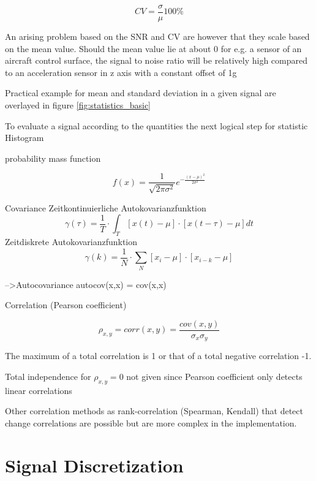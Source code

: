 \begin{equation}
    \label{eq:coeff_var}
    CV = \frac{\sigma}{\mu}100\%
\end{equation}

An arising problem based on the SNR and CV are however that they scale based on the mean value. Should the mean value lie at about 0 for e.g. a sensor of an aircraft control surface, the signal to noise ratio will be relatively high compared to an acceleration sensor in z axis with a constant offset of 1g

Practical example for mean and standard deviation in a given signal are overlayed in figure \ref{fig:statistics_basic}


To evaluate a signal according to the quantities the next logical step for statistic Histogram

probability mass function

\begin{equation}
    f(x)=\frac{1}{\sqrt{2 \pi \sigma^2}} e^{-\frac{(x-\mu)^2}{2 \sigma^2}}
\end{equation}


Covariance
Zeitkontinuierliche Autokovarianzfunktion
$$
\gamma(\tau)=\frac{1}{T} \cdot \int_T[x(t)-\mu] \cdot[x(t-\tau)-\mu] d t
$$
Zeitdiskrete Autokovarianzfunktion
$$
\gamma(k)=\frac{1}{N} \cdot \sum_N\left[x_i-\mu\right] \cdot\left[x_{i-k}-\mu\right]
$$

-->Autocovariance
autocov(x,x) = cov(x,x)


Correlation (Pearson coefficient)

$$\rho_{x,y} = corr(x,y)=\frac{cov(x,y)}{\sigma_x \sigma_y}$$

The maximum of a total correlation is 1 or that of a total negative correlation -1.

Total independence for $\rho_{x,y}=0$ not given since Pearson coefficient only detects linear correlations

Other correlation methods as rank-correlation (Spearman, Kendall) that detect change correlations are possible but are more complex in the implementation.


\section{Signal Discretization}


